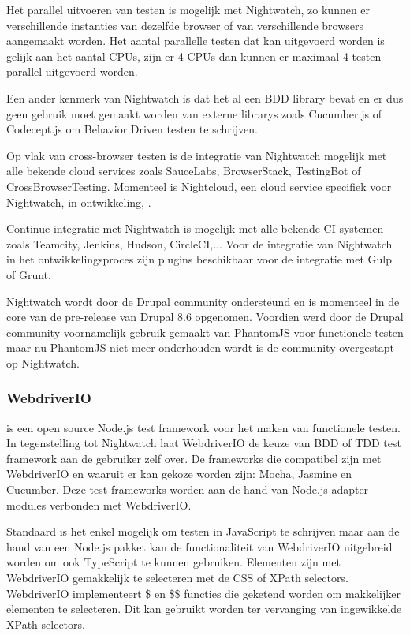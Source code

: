 Het parallel uitvoeren van testen is mogelijk met Nightwatch, zo kunnen er verschillende instanties van dezelfde browser of van verschillende browsers aangemaakt worden. Het aantal parallelle testen dat kan uitgevoerd worden is gelijk aan het aantal \glspl{CPU}, zijn er 4 \glspl{CPU} dan kunnen er maximaal 4 testen parallel uitgevoerd worden.

Een ander kenmerk van Nightwatch is dat het al een \gls{BDD} \gls{library} bevat en er dus geen gebruik moet gemaakt worden van externe \glspl{library} zoals Cucumber.js of Codecept.js om Behavior Driven testen te schrijven.

Op vlak van cross-browser testen is de integratie van Nightwatch mogelijk met alle bekende cloud services zoals SauceLabs, BrowserStack, TestingBot of CrossBrowserTesting. Momenteel is Nightcloud, een cloud service specifiek voor Nightwatch, in ontwikkeling, \textcite{Nightcloud2017}.

Continue integratie met Nightwatch is mogelijk met alle bekende \gls{CI} systemen zoals Teamcity, Jenkins, Hudson, CircleCI,... Voor de integratie van Nightwatch in het ontwikkelingsproces zijn plugins beschikbaar voor de integratie met \gls{Gulp} of \gls{Grunt}.

Nightwatch wordt door de Drupal community ondersteund en is momenteel in de core van de pre-release van Drupal 8.6 opgenomen. Voordien werd door de Drupal community voornamelijk gebruik gemaakt van PhantomJS voor functionele testen maar nu PhantomJS niet meer onderhouden wordt is de community overgestapt op Nightwatch.

\subsubsection{WebdriverIO}
\textcite{WebdriverIO} is een open source Node.js test \gls{framework} voor het maken van functionele testen. In tegenstelling tot Nightwatch laat WebdriverIO de keuze van \gls{BDD} of \gls{TDD} test \gls{framework} aan de gebruiker zelf  over. De \glspl{framework} die compatibel zijn met WebdriverIO en waaruit er kan gekoze worden zijn: Mocha, Jasmine en Cucumber. Deze test \glspl{framework} worden aan de hand van Node.js adapter modules verbonden met WebdriverIO.

Standaard is het enkel mogelijk om testen in JavaScript te schrijven maar aan de hand van een Node.js pakket kan de functionaliteit van WebdriverIO uitgebreid worden om ook \gls{TypeScript} te kunnen gebruiken. Elementen zijn met WebdriverIO gemakkelijk te selecteren met de \gls{CSS} of \gls{XPath} selectors. WebdriverIO implementeert \$ en \$\$ functies die geketend worden om makkelijker elementen te selecteren. Dit kan gebruikt worden ter vervanging van ingewikkelde \gls{XPath} selectors.


